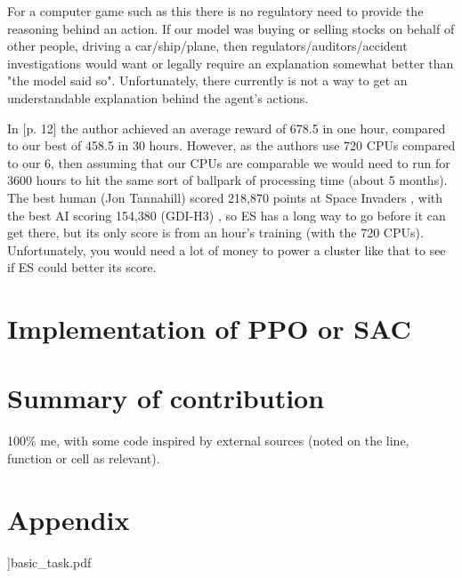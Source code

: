 \documentclass[a4pape, 11pt, english]{article}
\begin{document}
For a computer game such as this there is no regulatory need to provide the reasoning behind an action. If our model was buying or selling stocks on behalf of other people, driving a car/ship/plane, then regulators/auditors/accident investigations would want or legally require an explanation somewhat better than "the model said so". Unfortunately, there currently is not a way to get an understandable explanation behind the agent's actions.

In \citep{salimans_evolution_2017}[p. 12] the author achieved an average reward of 678.5 in one hour, compared to our best of 458.5 in 30 hours. However, as the authors use 720 CPUs compared to our 6, then assuming that our CPUs are comparable we would need to run for 3600 hours to hit the same sort of ballpark of processing time (about 5 months). The best human (Jon Tannahill) scored 218,870 points at Space Invaders \citep{day_beating_2018}, with the best AI scoring 154,380 (GDI-H3) \citep{papers_with_code_papers_nodate}, so ES has a long way to go before it can get there, but its only score is from an hour's training (with the 720 CPUs). Unfortunately, you would need a lot of money to power a cluster like that to see if ES could better its score.

\section{Implementation of PPO or SAC}

\section{Summary of contribution}
100\% me, with some code inspired by external sources (noted on the line, function or cell as relevant).



\section{Appendix}

]{basic_task.pdf}
\end{document}
